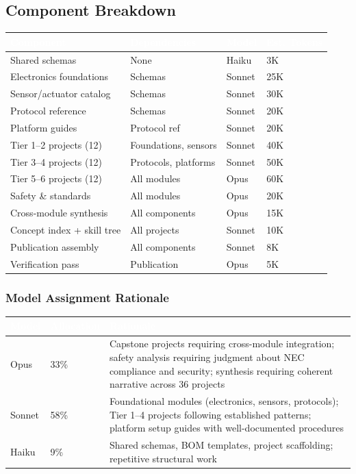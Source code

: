 \documentclass[11pt,letterpaper]{article}
\newcommand{\tableheader}[1]{\textbf{\sffamily\textcolor{white}{#1}}}
\begin{document}
\subsection{Component Breakdown}

\begin{center}
\begin{tabularx}{\textwidth}{L{3.5cm}L{2.5cm}C{1.5cm}C{2cm}}
\toprule
{}
\tableheader{Component} & \tableheader{Dependencies} & \tableheader{Model} & \tableheader{Est. Tokens} \\
\midrule
Shared schemas & None & Haiku & 3K \\
Electronics foundations & Schemas & Sonnet & 25K \\
Sensor/actuator catalog & Schemas & Sonnet & 30K \\
Protocol reference & Schemas & Sonnet & 20K \\
Platform guides & Protocol ref & Sonnet & 20K \\
Tier 1--2 projects (12) & Foundations, sensors & Sonnet & 40K \\
Tier 3--4 projects (12) & Protocols, platforms & Sonnet & 50K \\
Tier 5--6 projects (12) & All modules & Opus & 60K \\
Safety \& standards & All modules & Opus & 20K \\
Cross-module synthesis & All components & Opus & 15K \\
Concept index + skill tree & All projects & Sonnet & 10K \\
Publication assembly & All components & Sonnet & 8K \\
Verification pass & Publication & Opus & 5K \\
\bottomrule
\end{tabularx}
\end{center}

\subsubsection{Model Assignment Rationale}

\begin{center}
\begin{tabularx}{\textwidth}{C{1.5cm}C{1.5cm}X}
\toprule
{}
\tableheader{Model} & \tableheader{Allocation} & \tableheader{Rationale} \\
\midrule
Opus & 33\% & Capstone projects requiring cross-module integration; safety analysis requiring judgment about NEC compliance and security; synthesis requiring coherent narrative across 36 projects \\
Sonnet & 58\% & Foundational modules (electronics, sensors, protocols); Tier 1--4 projects following established patterns; platform setup guides with well-documented procedures \\
Haiku & 9\% & Shared schemas, BOM templates, project scaffolding; repetitive structural work \\
\bottomrule
\end{tabularx}
\end{center}
\end{document}
